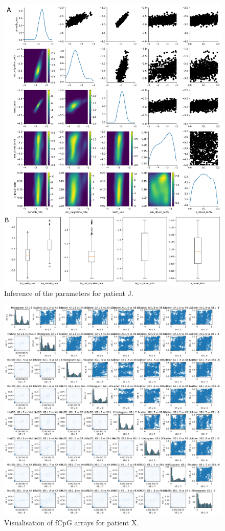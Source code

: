 \begin{figure}[h]
\centering
\includegraphics[width=\textwidth]{Chapter_5/figures/inference_J.pdf}
\caption{Inference of the parameters for patient J.}
\label{fig:inference_J}
\end{figure}

\begin{figure}[ht]
\centering
\includegraphics[width=\textwidth]{Chapter_5/figures/fCpG_loci_X.png}
\caption{Visualisation of fCpG arrays for patient X.}
\label{fig:vis_X}
\end{figure}

